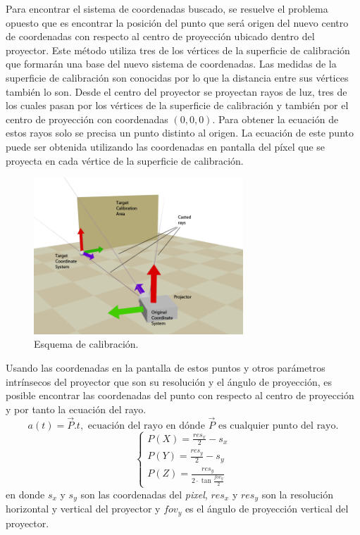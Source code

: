 Para encontrar el sistema de coordenadas buscado, se resuelve el problema opuesto que es encontrar la posición del punto que será origen del nuevo centro de coordenadas con respecto al centro de proyección ubicado dentro del proyector. Este método utiliza tres de los vértices de la superficie de calibración que formarán una base del nuevo sistema de coordenadas. Las medidas de la superficie de calibración son conocidas por lo que la distancia entre sus vértices también lo son. Desde el centro del proyector se proyectan rayos de luz, tres de los cuales pasan por los vértices de la superficie de calibración y también por el centro de proyección con coordenadas $(0, 0, 0)$. Para obtener la ecuación de estos rayos solo se precisa un punto distinto al origen. La ecuación de este punto puede ser obtenida utilizando las coordenadas en pantalla del píxel que se proyecta en cada vértice de la superficie de calibración.
\begin{figure}[H]
  \centering
    \includegraphics[width=0.7\textwidth]{./Cap2_videomapping/CalibrationSketch}
  \caption{Esquema de calibración.}
  \label{fig:CalibrationSketch}
\end{figure}
Usando las coordenadas en la pantalla de estos puntos y otros parámetros intrínsecos del proyector que son su resolución y el ángulo de proyección, es posible encontrar las coordenadas del punto con respecto al centro de proyección y por tanto la ecuación del rayo.
\[
a(t) = \vec{P} . t,	\mbox{ ecuación del rayo en dónde } \vec{P} \mbox{ es cualquier punto del rayo.}
\]
\[
\begin{cases}
P(X) = \frac{res_x}{2} - s_x \\
P(Y) = \frac{res_y}{2} - s_y \\
P(Z) = \frac{res_y}{2 \cdot \tan \frac{fov_y}{2}}
\end{cases}
\]
en donde $s_x$ y $s_y$ son las coordenadas del \emph{pixel}, $res_x$ y $res_y$ son la resolución horizontal y vertical del proyector y $fov_y$ es el ángulo de proyección vertical del proyector.


